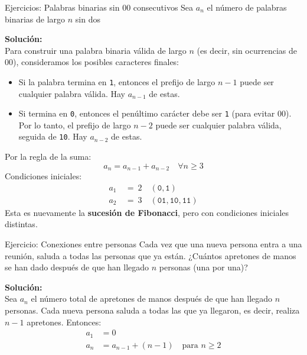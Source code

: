 \begin{exampleblock}{Ejercicios: Palabras binarias sin 00 consecutivos}
Sea $a_n$ el número de palabras binarias de largo $n$ sin dos 
\end{exampleblock}
\noindent \textbf{Solución:}\\
Para construir una palabra binaria válida de largo $n$ (es decir, sin ocurrencias de $00$), consideramos los posibles caracteres finales:
\begin{itemize}
  \item Si la palabra termina en \texttt{1}, entonces el prefijo de largo $n - 1$ puede ser cualquier palabra válida. Hay $a_{n-1}$ de estas.
  \item Si termina en \texttt{0}, entonces el penúltimo carácter debe ser \texttt{1} (para evitar $00$). Por lo tanto, el prefijo de largo $n - 2$ puede ser cualquier palabra válida, seguida de \texttt{10}. Hay $a_{n-2}$ de estas.
\end{itemize}
Por la regla de la suma:
\[ a_n = a_{n-1} + a_{n-2} \quad \forall n\geq 3 \]
Condiciones iniciales:
\begin{align*}
a_1 &~=~ 2 \quad (\texttt{0}, \texttt{1}) \\
a_2 &~=~ 3 \quad (\texttt{01}, \texttt{10}, \texttt{11})
\end{align*}
Esta es nuevamente la \textbf{sucesión de Fibonacci}, pero con condiciones iniciales distintas.



\begin{exampleblock}{Ejercicio: Conexiones entre personas}
Cada vez que una nueva persona entra a una reunión, saluda a todas las personas que ya están. ¿Cuántos apretones de manos se han dado después de que han llegado $n$ personas (una por una)?
\end{exampleblock}
\noindent \textbf{Solución:}\\
Sea $a_n$ el número total de apretones de manos después de que han llegado $n$ personas. Cada nueva persona saluda a todas las que ya llegaron, es decir, realiza $n-1$ apretones. Entonces:
\begin{align*}
a_1 &= 0 \\
a_n &= a_{n-1} + (n - 1) \quad \text{para } n \geq 2
\end{align*}






